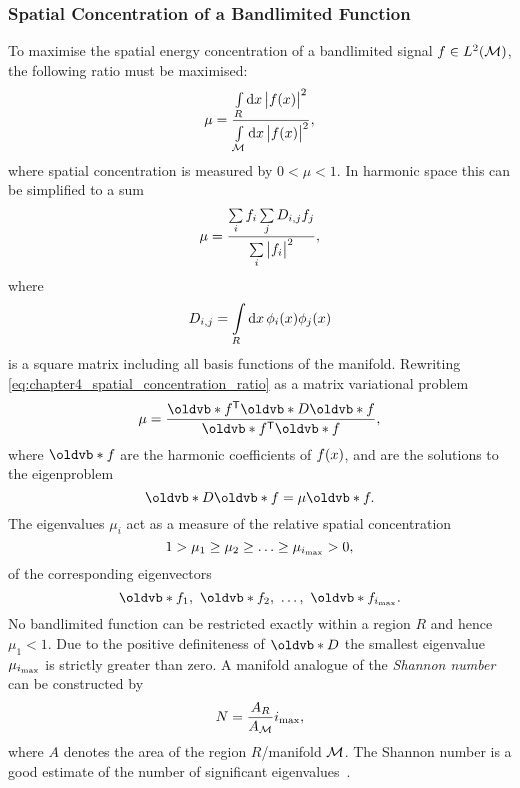

\subsubsection{Spatial Concentration of a Bandlimited Function}

To maximise the spatial energy concentration of a bandlimited signal \(f \in L^{2}(\mathcal{M})\), the following ratio must be maximised:
%
\begin{equation}
	\mu
	= \frac{\int\limits_{R} \dd{x} \big\lvert f(x)\big\rvert^{2}}{\int\limits_{\mathcal{M}} \dd{x} \big\lvert f(x)\big\rvert^{2}},
\end{equation}
%
where spatial concentration is measured by \(0 < \mu < 1\).
In harmonic space this can be simplified to a sum
%
\begin{equation}\label{eq:chapter4_spatial_concentration_ratio}
	\mu
	= \frac{\sum\limits_{i} f_{i} \sum\limits_{j} D_{i,j} f_{j}}{\sum\limits_{i} \big\lvert f_{i}\big\rvert^{2}},
\end{equation}
%
where
%
\begin{equation}
	D_{i,j}
	= \int\limits_{R} \dd{x} \phi_{i}(x) \phi_{j}(x)
\end{equation}
%
is a square matrix including all basis functions of the manifold.
Rewriting \cref{eq:chapter4_spatial_concentration_ratio} as a matrix variational problem
%
\begin{equation}
	\mu
	= \frac{\transpose{\vb{f}} \vb{D} \vb{f}}{\transpose{\vb{f}} \vb{f}},
\end{equation}
%
where \(\vb{f}\) are the harmonic coefficients of \(f(x)\), and are the solutions to the eigenproblem
%
\begin{equation}\label{eq:chapter4_eigenproblem}
	\vb{D}\vb{f}
	= \mu \vb{f}.
\end{equation}
%
The eigenvalues \(\mu_{i}\) act as a measure of the relative spatial concentration
%
\begin{equation}
	1 > \mu_{1} \geq \mu_{2} \geq \ldots \geq \mu_{\imax} > 0, %
\end{equation}
%
of the corresponding eigenvectors
%
\begin{equation}
	\vb{f}_{1},\ \vb{f}_{2},\ \ldots,\ \vb{f}_{\imax}.
\end{equation}
%
No bandlimited function can be restricted exactly within a region \(R\) and hence \(\mu_{1}<1\).
Due to the positive definiteness of \(\vb{D}\) the smallest eigenvalue \(\mu_{i_{\text{max}}}\) is strictly greater than zero.
A manifold analogue of the \emph{Shannon number} can be constructed by
%
\begin{equation}\label{eq:chapter4_shannon}
	N
	= \frac{A_{R}}{A_{\mathcal{M}}} i_{\text{max}},
\end{equation}
%
where \(A\) denotes the area of the region \(R\)/manifold \(\mathcal{M}{}\).
The Shannon number is a good estimate of the number of significant eigenvalues~\cite{Percival1993}.

